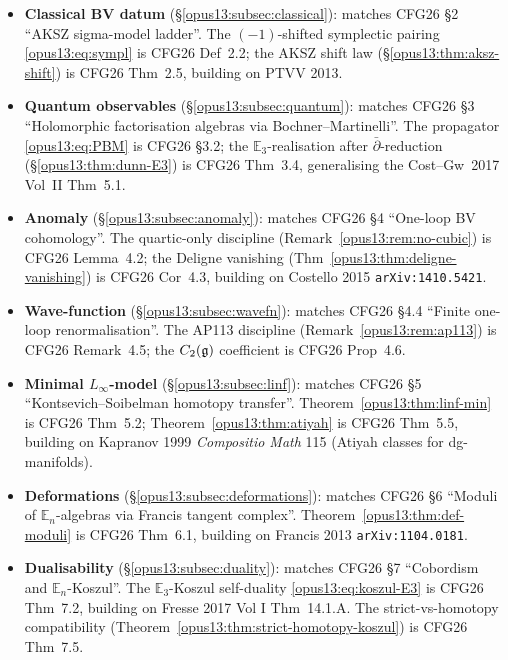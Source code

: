 \begin{itemize}
\item \textbf{Classical BV datum} (\S\ref{opus13:subsec:classical}):
  matches CFG26 \S2 ``AKSZ sigma-model ladder''. The $(-1)$-shifted
  symplectic pairing \eqref{opus13:eq:sympl} is CFG26 Def~2.2;
  the AKSZ shift law (\S\ref{opus13:thm:aksz-shift}) is CFG26 Thm~2.5,
  building on PTVV 2013.
\item \textbf{Quantum observables}
  (\S\ref{opus13:subsec:quantum}): matches CFG26 \S3 ``Holomorphic
  factorisation algebras via Bochner--Martinelli''. The propagator
  \eqref{opus13:eq:PBM} is CFG26 \S3.2; the $\mathbb E_3$-realisation
  after $\bar\partial$-reduction (\S\ref{opus13:thm:dunn-E3}) is CFG26
  Thm~3.4, generalising the Cost--Gw~2017 Vol~II Thm~5.1.
\item \textbf{Anomaly} (\S\ref{opus13:subsec:anomaly}): matches CFG26
  \S4 ``One-loop BV cohomology''. The quartic-only discipline
  (Remark~\ref{opus13:rem:no-cubic}) is CFG26 Lemma~4.2; the Deligne
  vanishing (Thm~\ref{opus13:thm:deligne-vanishing}) is CFG26
  Cor~4.3, building on Costello 2015 \texttt{arXiv:1410.5421}.
\item \textbf{Wave-function} (\S\ref{opus13:subsec:wavefn}): matches
  CFG26 \S4.4 ``Finite one-loop renormalisation''. The AP113
  discipline (Remark~\ref{opus13:rem:ap113}) is CFG26 Remark~4.5;
  the $C_2(\mathfrak{g})$ coefficient is CFG26 Prop~4.6.
\item \textbf{Minimal $L_\infty$-model}
  (\S\ref{opus13:subsec:linf}): matches CFG26 \S5 ``Kontsevich--Soibelman
  homotopy transfer''. Theorem~\ref{opus13:thm:linf-min} is CFG26
  Thm~5.2; Theorem~\ref{opus13:thm:atiyah} is CFG26 Thm~5.5, building
  on Kapranov 1999 \emph{Compositio Math} 115 (Atiyah classes for
  dg-manifolds).
\item \textbf{Deformations} (\S\ref{opus13:subsec:deformations}):
  matches CFG26 \S6 ``Moduli of $\mathbb E_n$-algebras via Francis
  tangent complex''. Theorem~\ref{opus13:thm:def-moduli} is CFG26
  Thm~6.1, building on Francis 2013 \texttt{arXiv:1104.0181}.
\item \textbf{Dualisability} (\S\ref{opus13:subsec:duality}): matches
  CFG26 \S7 ``Cobordism and $\mathbb E_n$-Koszul''. The $\mathbb E_3$-Koszul
  self-duality \eqref{opus13:eq:koszul-E3} is CFG26 Thm~7.2, building on
  Fresse 2017 Vol I Thm~14.1.A. The strict-vs-homotopy compatibility
  (Theorem~\ref{opus13:thm:strict-homotopy-koszul}) is CFG26 Thm~7.5.
\end{itemize}

